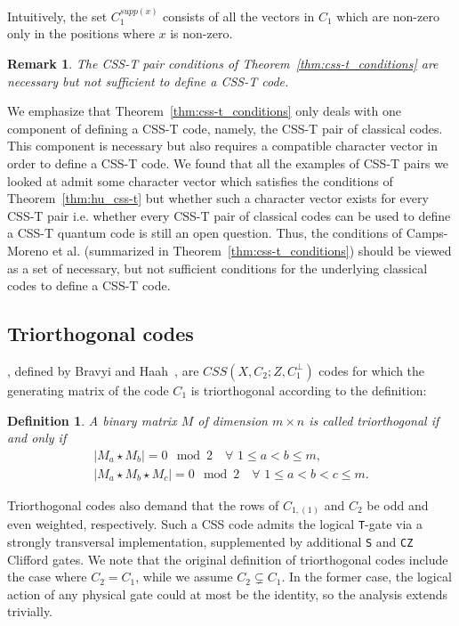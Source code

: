 \documentclass[journal]{IEEEtran}
\newcommand{\T}{\texttt{T}}
\newtheorem{definition}{Definition}[section]
\newtheorem{remark}{Remark}[theorem]
\begin{document}
Intuitively, the set $C_1^{supp(x)}$ consists of all the vectors in $C_1$ which are non-zero only in the positions where $x$ is non-zero.


\begin{remark}
    The CSS-T pair conditions of Theorem~\ref{thm:css-t_conditions} are necessary but not sufficient to define a CSS-T code.
\end{remark}

We emphasize that Theorem~\ref{thm:css-t_conditions} only deals with one component of defining a CSS-T code, namely, the CSS-T pair of classical codes. This component is necessary but also requires a compatible character vector in order to define a CSS-T code. We found that all the examples of CSS-T pairs we looked at admit some character vector which satisfies the conditions of Theorem~\ref{thm:hu_css-t} but whether such a character vector exists for every CSS-T pair i.e. whether every CSS-T pair of classical codes can be used to define a CSS-T quantum code is still an open question. Thus, the conditions of Camps-Moreno et al. (summarized in Theorem~\ref{thm:css-t_conditions}) should be viewed as a set of necessary, but not sufficient conditions for the underlying classical codes to define a CSS-T code.


\subsection{Triorthogonal codes}\label{subsec:triortho}
, defined by Bravyi and Haah~\cite{bravyi_magic-state_2012}, are $CSS(X,C_2;Z,C_1^\perp)$ codes for which the generating matrix of the code $C_1$ is triorthogonal according to the definition:
\begin{definition}\label{def:triortho}
    A binary matrix $M$ of dimension $m \times n$ is called triorthogonal if and only if 
    \begin{eqnarray}
       |M_a\star M_b| = 0 \mod{2} \quad \forall \,\, 1\leq a < b \leq m ,\\
       |M_a\star M_b \star M_c| = 0 \mod{2} \quad \forall \,\, 1\leq a < b <c \leq m .
    \end{eqnarray}
\end{definition}

 Triorthogonal codes also demand that the rows of $C_{1,(1)}$ and $C_{2}$ be odd and even weighted, respectively. Such a CSS code admits the logical \T-gate via a strongly transversal implementation, supplemented by additional \texttt{S} and \texttt{CZ} Clifford gates. We note that the original definition of triorthogonal codes include the case where $C_2=C_1$, while we assume $C_2\subsetneq C_1$. In the former case, the logical action of any physical gate could at most be the identity, so the analysis extends trivially.
\end{document}

